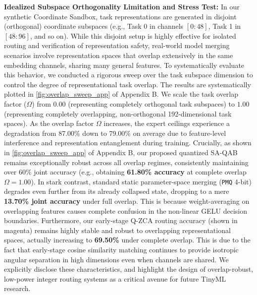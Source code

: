 \textbf{Idealized Subspace Orthogonality Limitation and Stress Test:} In our synthetic Coordinate Sandbox, task representations are generated in disjoint (orthogonal) coordinate subspaces (e.g., Task 0 in channels $[0:48]$, Task 1 in $[48:96]$, and so on). While this disjoint setup is highly effective for isolated routing and verification of representation safety, real-world model merging scenarios involve representation spaces that overlap extensively in the same embedding channels, sharing many general features. To systematically evaluate this behavior, we conducted a rigorous sweep over the task subspace dimension to control the degree of representational task overlap. The results are systematically plotted in \cref{fig:overlap_sweep_app} of Appendix B. We scale the task overlap factor ($\Omega$) from $0.00$ (representing completely orthogonal task subspaces) to $1.00$ (representing completely overlapping, non-orthogonal 192-dimensional task spaces). As the overlap factor $\Omega$ increases, the expert ceilings experience a degradation from 87.00\% down to 79.00\% on average due to feature-level interference and representation entanglement during training. Crucially, as shown in \cref{fig:overlap_sweep_app} of Appendix B, our proposed quantized SA-QAB remains exceptionally robust across all overlap regimes, consistently maintaining over 60\% joint accuracy (e.g., obtaining \textbf{61.80\% accuracy} at complete overlap $\Omega=1.00$). In stark contrast, standard static parameter-space merging (\texttt{PMQ} 4-bit) degrades even further from its already collapsed state, dropping to a mere \textbf{13.70\% joint accuracy} under full overlap. This is because weight-averaging on overlapping features causes complete confusion in the non-linear GELU decision boundaries. Furthermore, our early-stage Q-ZCA routing accuracy (shown in magenta) remains highly stable and robust to overlapping representational spaces, actually increasing to \textbf{69.50\%} under complete overlap. This is due to the fact that early-stage cosine similarity matching continues to provide isotropic angular separation in high dimensions even when channels are shared. We explicitly disclose these characteristics, and highlight the design of overlap-robust, low-power integer routing systems as a critical avenue for future TinyML research.

